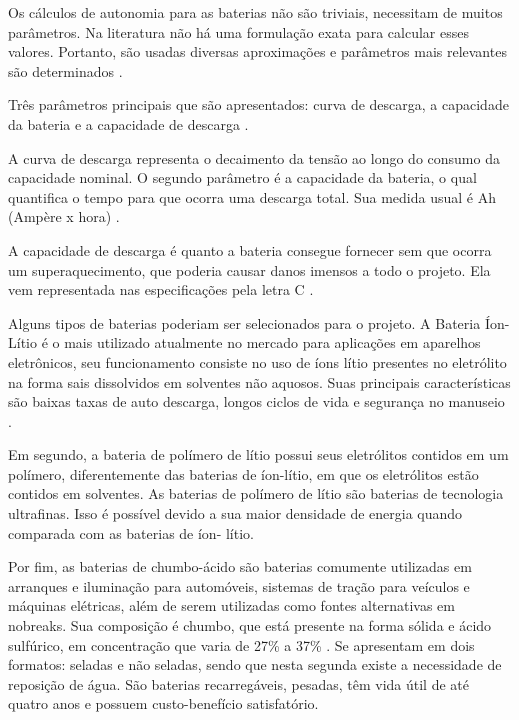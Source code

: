 \begin{itemize}
    Os cálculos de autonomia para as baterias não são triviais, necessitam de muitos parâmetros. Na literatura não
    há uma formulação exata para calcular esses valores. Portanto, são usadas diversas aproximações e parâmetros mais
    relevantes são determinados \cite{MEGGLIAR}.

    Três parâmetros principais que são apresentados: curva de descarga, a capacidade da bateria e a capacidade de
    descarga \cite{MEGGLIAR}.

    A curva de descarga representa o decaimento da tensão ao longo do consumo da capacidade nominal. O segundo parâmetro
    é a capacidade da bateria, o qual quantifica o tempo para que ocorra uma descarga total. Sua medida usual é Ah
    (Ampère x hora) \cite{MEGGLIAR}.

    A capacidade de descarga é quanto a bateria consegue fornecer sem que ocorra um superaquecimento, que poderia
    causar danos imensos a todo o projeto. Ela vem representada nas especificações pela letra C \cite{MEGGLIAR}.

    Alguns tipos de baterias poderiam ser selecionados para o projeto. A Bateria Íon- Lítio é o mais utilizado atualmente
    no mercado para aplicações em aparelhos eletrônicos, seu funcionamento consiste no uso de íons lítio presentes no
    eletrólito na forma sais dissolvidos em solventes não aquosos. Suas principais características são baixas taxas de auto
    descarga, longos ciclos de vida e segurança no manuseio \cite{castillo2002advances}.

    Em segundo, a bateria de polímero de lítio possui seus eletrólitos contidos em um polímero, diferentemente das baterias
    de íon-lítio, em que os eletrólitos estão contidos em solventes. As baterias de polímero de lítio são baterias de tecnologia
    ultrafinas. Isso é possível devido a sua maior densidade de energia quando comparada com as baterias de íon- lítio.

    Por fim, as baterias de chumbo-ácido são baterias comumente utilizadas em arranques e iluminação para automóveis,
    sistemas de tração para veículos e máquinas elétricas, além de serem utilizadas como fontes alternativas em nobreaks.
    Sua composição é chumbo, que está presente na forma sólida e ácido sulfúrico, em concentração que varia de 27\% a 37\% 
    \cite{pulsada2005juliano}. Se apresentam em dois formatos: seladas e não seladas, sendo que nesta segunda existe a necessidade de
    reposição de água. São baterias recarregáveis, pesadas, têm vida útil de até quatro anos e possuem custo-benefício satisfatório.


\end{itemize}
